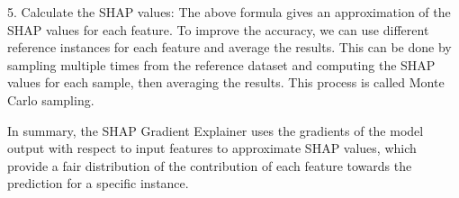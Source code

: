 5. Calculate the SHAP values: The above formula gives an approximation of the SHAP values for each feature. To improve the accuracy, we can use different reference instances for each feature and average the results. This can be done by sampling multiple times from the reference dataset and computing the SHAP values for each sample, then averaging the results. This process is called Monte Carlo sampling.

In summary, the SHAP Gradient Explainer uses the gradients of the model output with respect to input features to approximate SHAP values, which provide a fair distribution of the contribution of each feature towards the prediction for a specific instance.